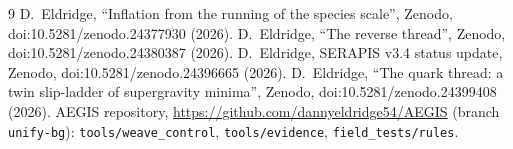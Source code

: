 \documentclass[aps,prd,twocolumn,superscriptaddress,nofootinbib,showkeys]{revtex4-2}
\begin{document}
\begin{thebibliography}{9}
 D.~Eldridge, ``Inflation from the running of the species scale'', Zenodo, doi:10.5281/zenodo.24377930 (2026).
 D.~Eldridge, ``The reverse thread'', Zenodo, doi:10.5281/zenodo.24380387 (2026).
 D.~Eldridge, SERAPIS v3.4 status update, Zenodo, doi:10.5281/zenodo.24396665 (2026).
 D.~Eldridge, ``The quark thread: a twin slip-ladder of supergravity minima'', Zenodo, doi:10.5281/zenodo.24399408 (2026).
 AEGIS repository, \url{https://github.com/dannyeldridge54/AEGIS} (branch \texttt{unify-bg}): \texttt{tools/weave\_control}, \texttt{tools/evidence}, \texttt{field\_tests/rules}.
\end{thebibliography}
\end{document}
